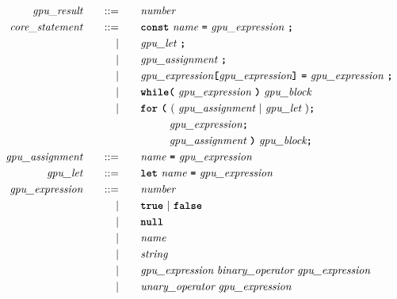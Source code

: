 \begin{alignat*}{9}
    && \textit{gpu\_result} 
    &&\quad ::= &\quad && \textit{number} \\
    && \textit{core\_statement} 
    &&\quad ::= &\quad 
    && \textbf{\texttt{const}}\  \textit{name} \ 
        \textbf{\texttt{=}}\  \textit{gpu\_expression} \ \textbf{\texttt{;}} \\
    &&  && |    &\quad &&  \textit{gpu\_let} \ \textbf{\texttt{;}} \\
    &&  && |    &\quad &&  \textit{gpu\_assignment} \ \textbf{\texttt{;}} \\
    &&  && |    &\quad &&  \textit{gpu\_expression} \textbf{\texttt{[}} \textit{gpu\_expression} \textbf{\texttt{]}}\ \textbf{\texttt{=}}\  \textit{gpu\_expression} \ \textbf{\texttt{;}} \\
    &&  && |    &\quad &&  \textbf{\texttt{while}} \textbf{\texttt{(}}\  \textit{gpu\_expression} \ \textbf{\texttt{)}} \ \textit{gpu\_block} \\
    &&  && |    &\quad &&  \textbf{\texttt{for}}\ \textbf{\texttt{(}} 
                              \  ( \ \textit{gpu\_assignment} \ | \ \textit{gpu\_let} \ )\textbf{\texttt{;}} \\
    &&  &&     &\quad && \ \ \ \ \ \ \ \  \textit{gpu\_expression} \textbf{\texttt{;}} \\
    &&  &&     &\quad && \ \ \ \ \ \ \ \  \textit{gpu\_assignment} \ \textbf{\texttt{)}}  \ \textit{gpu\_block} \textbf{\texttt{;}} \\
    && \textit{gpu\_assignment} 
    &&\quad ::= &\quad 
    && \textit{name} \ \textbf{\texttt{=}}\  \textit{gpu\_expression} \\
    && \textit{gpu\_let} 
    &&\quad ::= &\quad 
    && \textbf{\texttt{let}} \ \textit{name} \ \textbf{\texttt{=}}\  \textit{gpu\_expression} \\
    && \textit{gpu\_expression} 
    &&\quad ::= &\quad 
    && \textit{number} \\
    &&  && |    &\quad &&  \textbf{\texttt{true}} \ | \ \textbf{\texttt{false}} \\
    &&  && |    &\quad &&  \textbf{\texttt{null}} \\
    &&  && |    &\quad &&  \textit{name}\\
    &&  && |    &\quad &&  \textit{string}\\
    &&  && |    &\quad &&  \textit{gpu\_expression} \ \textit{binary\_operator} \ \textit{gpu\_expression} \\
    &&  && |    &\quad &&  \textit{unary\_operator} \ \textit{gpu\_expression} \\

\end{alignat*}
